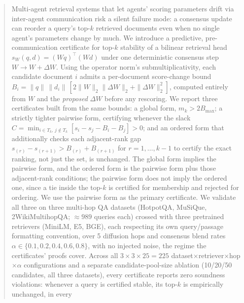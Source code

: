 \begin{abstract}
Multi-agent retrieval systems that let agents' scoring parameters drift via
inter-agent communication risk a silent failure mode: a consensus update can
reorder a query's top-$k$ retrieved documents even when no single agent's
parameters change by much. We introduce a predictive, pre-communication
certificate for top-$k$ stability of a bilinear retrieval head
$s_W(q,d) = (Wq)^\top(Wd)$ under one deterministic consensus step
$W \to W + \Delta W$. Using the operator norm's submultiplicativity, each
candidate document $i$ admits a per-document score-change bound
$B_i = \|q\|\,\|d_i\|\,[2\|W\|_2\|\Delta W\|_2 + \|\Delta W\|_2^2]$, computed
entirely from $W$ and the \emph{proposed} $\Delta W$ before any rescoring. We
report three certificates built from the same bounds: a global form,
$m_k > 2B_{\max}$; a strictly tighter pairwise form, certifying whenever the
slack $C = \min_{i\in T_k,\,j\notin T_k}[s_i - s_j - B_i - B_j] > 0$; and an
ordered form that additionally checks each adjacent-rank gap
$s_{(r)} - s_{(r+1)} > B_{(r)} + B_{(r+1)}$ for $r = 1,\dots,k-1$ to certify
the exact ranking, not just the set, is unchanged. The global form implies
the pairwise form, and the ordered form is the pairwise form plus those
adjacent-rank conditions; the pairwise form does not imply the ordered one,
since a tie inside the top-$k$ is certified for membership and rejected for
ordering. We use the pairwise form as the primary certificate. We
validate all three on three multi-hop QA datasets (HotpotQA,
MuSiQue, 2WikiMultihopQA; $\approx 989$ queries each) crossed with three
pretrained retrievers (MiniLM, E5, BGE), each respecting its own
query/passage formatting convention, over 5 diffusion hops and consensus
blend rates $\alpha \in \{0.1, 0.2, 0.4, 0.6, 0.8\}$, with no injected noise,
the regime the certificates' proofs cover. Across all $3\times3\times25 =
225$ dataset$\times$retriever$\times$hop$\times\alpha$ configurations and a
separate candidate-pool-size ablation (10/20/50 candidates, all three
datasets), every certificate reports zero soundness violations: whenever a
query is certified stable, its top-$k$ is empirically unchanged, in every

\end{abstract}
